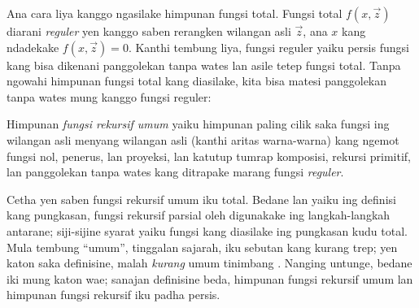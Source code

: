 \documentclass[../../../include/open-logic-section]{subfiles}
\begin{document}

Ana cara liya kanggo ngasilake himpunan fungsi total.
Fungsi total $f(x,\vec z)$ diarani \emph{reguler}
yen kanggo saben rerangken wilangan asli $\vec z$,
ana $x$ kang ndadekake $f(x,\vec z) = 0$.
Kanthi tembung liya, fungsi reguler yaiku persis
fungsi kang bisa dikenani panggolekan tanpa wates
lan asile tetep fungsi total. Tanpa ngowahi
himpunan fungsi total kang diasilake, kita bisa
matesi panggolekan tanpa wates mung kanggo
fungsi reguler:

\begin{defn}
Himpunan \emph{fungsi rekursif umum} yaiku
himpunan paling cilik saka fungsi ing wilangan asli
menyang wilangan asli (kanthi aritas warna-warna)
kang ngemot fungsi nol, penerus, lan proyeksi,
lan katutup tumrap komposisi, rekursi primitif,
lan panggolekan tanpa wates kang ditrapake
marang fungsi \emph{reguler}.
\end{defn}

Cetha yen saben fungsi rekursif umum iku total.
Bedane  lan
 yaiku ing definisi
kang pungkasan, fungsi rekursif parsial oleh
digunakake ing langkah-langkah antarane; siji-sijine
syarat yaiku fungsi kang diasilake ing pungkasan
kudu total. Mula tembung ``umum'', tinggalan
sajarah, iku sebutan kang kurang trep; yen
katon saka definisine,
 malah \emph{kurang}
umum tinimbang .
Nanging untunge, bedane iki mung katon wae;
sanajan definisine beda, himpunan fungsi
rekursif umum lan himpunan fungsi rekursif
iku padha persis.
\end{document}
